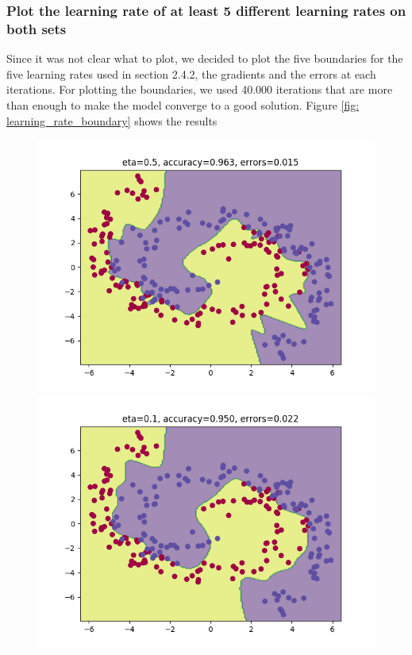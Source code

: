 \documentclass[11pt]{article}
\begin{document}
\subsubsection{Plot the learning rate of at least 5 different learning rates on both sets}
Since it was not clear what to plot, we decided to plot the five boundaries for the five learning rates used in section 2.4.2, the gradients and the errors at each iterations. For plotting the boundaries, we used 40.000 iterations that are more than enough to make the model converge to a good solution. Figure \ref{fig: learning_rate_boundary} shows the results
\begin{figure}[H]
	\includegraphics[scale=0.5]{images/NN_boundary_vs_learning_rates/0}
	\includegraphics[scale=0.5]{images/NN_boundary_vs_learning_rates/1}

\end{figure}
\end{document}
